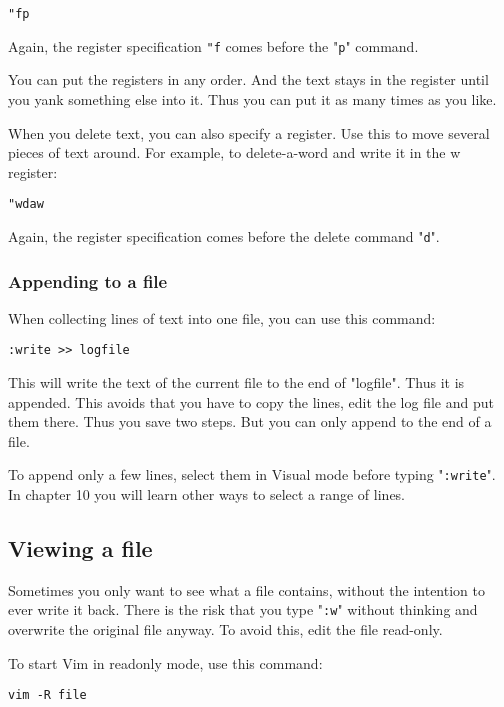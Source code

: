 \begin{Verbatim}[samepage=true]
 "fp
 \end{Verbatim}

Again, the register specification \texttt{"f} comes before the "\texttt{p}" command.

You can put the registers in any order.
And the text stays in the register until you yank something else into it.
Thus you can put it as many times as you like.

When you delete text, you can also specify a register.
Use this to move several pieces of text around.
For example, to delete-a-word and write it in the w register:

 \begin{Verbatim}[samepage=true]
 "wdaw
 \end{Verbatim}

Again, the register specification comes before the delete command "\texttt{d}".

\subsubsection{Appending to a file}
When collecting lines of text into one file, you can use this command:

 \begin{Verbatim}[samepage=true]
 :write >> logfile
 \end{Verbatim}

This will write the text of the current file to the end of "logfile".
Thus it is appended.
This avoids that you have to copy the lines, edit the log file and put them there.
Thus you save two steps.
But you can only append to the end of a file.

To append only a few lines, select them in Visual mode before typing "\texttt{:write}".
In chapter 10 you will learn other ways to select a range of lines.

\subsection{Viewing a file}
Sometimes you only want to see what a file contains, without the intention to ever write it back.
There is the risk that you type "\texttt{:w}" without thinking and overwrite the original file anyway.
To avoid this, edit the file read-only.

To start Vim in readonly mode, use this command:

 \begin{Verbatim}[samepage=true]
 vim -R file
 \end{Verbatim}

